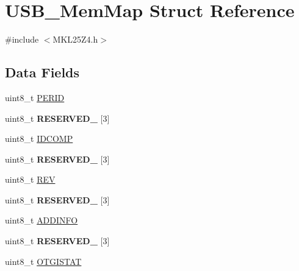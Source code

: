 \hypertarget{struct_u_s_b___mem_map}{}\section{U\+S\+B\+\_\+\+Mem\+Map Struct Reference}
\label{struct_u_s_b___mem_map}


{\ttfamily \#include $<$M\+K\+L25\+Z4.\+h$>$}

\subsection*{Data Fields}
\begin{DoxyCompactItemize}
\item 
uint8\+\_\+t \hyperlink{struct_u_s_b___mem_map_aa3644755d5a3d7b9a8c01055452ebe39}{P\+E\+R\+ID}
\item 
\mbox{\label{struct_u_s_b___mem_map_a4b7eb7f7cc53dc2ce43ba695fdee3ced}} 
uint8\+\_\+t {\bfseries R\+E\+S\+E\+R\+V\+E\+D\+\_} \mbox{[}3\mbox{]}
\item 
uint8\+\_\+t \hyperlink{struct_u_s_b___mem_map_a87d65236c6baf792a723600b0623eca5}{I\+D\+C\+O\+MP}
\item 
\mbox{\label{struct_u_s_b___mem_map_ad2d7e12d4409f3ca3b795edc099698b0}} 
uint8\+\_\+t {\bfseries R\+E\+S\+E\+R\+V\+E\+D\+\_} \mbox{[}3\mbox{]}
\item 
uint8\+\_\+t \hyperlink{struct_u_s_b___mem_map_ac918187248616aac7e5223124ea9610d}{R\+EV}
\item 
\mbox{\label{struct_u_s_b___mem_map_a0a53453a4001c42a5cceb359c68097cc}} 
uint8\+\_\+t {\bfseries R\+E\+S\+E\+R\+V\+E\+D\+\_} \mbox{[}3\mbox{]}
\item 
uint8\+\_\+t \hyperlink{struct_u_s_b___mem_map_aa87a73875ff45abb9b84992687f48000}{A\+D\+D\+I\+N\+FO}
\item 
\mbox{\label{struct_u_s_b___mem_map_abc1a41779b0653a09580c6dac4e39206}} 
uint8\+\_\+t {\bfseries R\+E\+S\+E\+R\+V\+E\+D\+\_} \mbox{[}3\mbox{]}
\item 
uint8\+\_\+t \hyperlink{struct_u_s_b___mem_map_a6eacb73f23f815f7686f4e7bf7eb2fcc}{O\+T\+G\+I\+S\+T\+AT}
\item 
\mbox{\label{struct_u_s_b___mem_map_ac3f90a346f328a9959bedeb9af0c48eb}} 

\end{DoxyCompactItemize}
